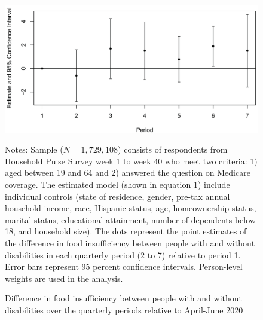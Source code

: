 \documentclass[12pt]{article}
\begin{document}
\begin{figure}[h!]\label{food_insuf_wc}
\caption{Difference in food insufficiency between people with and without disabilities over the quarterly periods relative to April-June 2020}
\centering
\includegraphics[scale=0.8]{Exhibits/food_insuf_event_study_with_controls.jpg}
\medskip 
\begin{minipage}{0.8\textwidth} 
{\footnotesize Notes: Sample ($N=1,729,108$) consists of respondents from Household Pulse Survey week 1 to week 40 who meet two criteria: 1) aged between 19 and 64 and 2) answered the question on Medicare coverage. The estimated model (shown in equation 1) include individual controls (state of residence, gender, pre-tax annual household income, race, Hispanic status, age, homeownership status,
marital status, educational attainment, number of dependents below 18, and household size). The dots represent the point estimates of the difference in food insufficiency between people with and without disabilities in each quarterly period (2 to 7) relative to period 1. Error bars represent 95 percent confidence intervals. Person-level weights are used in the analysis. \par}
\end{minipage}
\end{figure}
\end{document}
